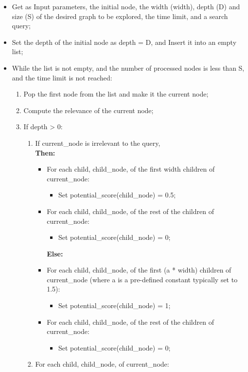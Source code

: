 \documentclass[paper=8.27in:11.69in, 14pt, DIV=calc]{scrartcl}
\begin{document}
\begin{itemize}
\item Get as Input parameters, the initial node, the width (width), depth (D) and size (S) of the desired graph to be explored, the time limit, and a search query;
\item Set the depth of the initial node as depth = D, and Insert it into an empty list;
\item While the list is not empty, and the number of processed nodes is less than S, and the time limit is not reached:
\begin{enumerate}[label=\arabic*.]
\item Pop the first node from the list and make it the current node;
\item Compute the relevance of the current node;
\item If depth > 0:
\begin{enumerate}[label=\arabic*.]
\item If current\_node is irrelevant to the query,\\
\textbf{Then:}
\begin{itemize}
\item For each child, child\_node, of the first width children of current\_node:
\begin{itemize}
\item Set potential\_score(child\_node) = 0.5;
\end{itemize}
\item For each child, child\_node, of the rest of the children of current\_node:
\begin{itemize}
\item Set potential\_score(child\_node) = 0;
\end{itemize}
\textbf{Else:}
\item For each child, child\_node, of the first (a * width) children of current\_node (where a is a pre-defined constant typically set to 1.5):
\begin{itemize}
\item Set potential\_score(child\_node) = 1;
\end{itemize}
\item For each child, child\_node, of the rest of the children of current\_node:
\begin{itemize}
\item Set potential\_score(child\_node) = 0;
\end{itemize}
\end{itemize}
\item For each child, child\_node, of current\_node:

\end{enumerate}
\end{enumerate}
\end{itemize}
\end{document}

